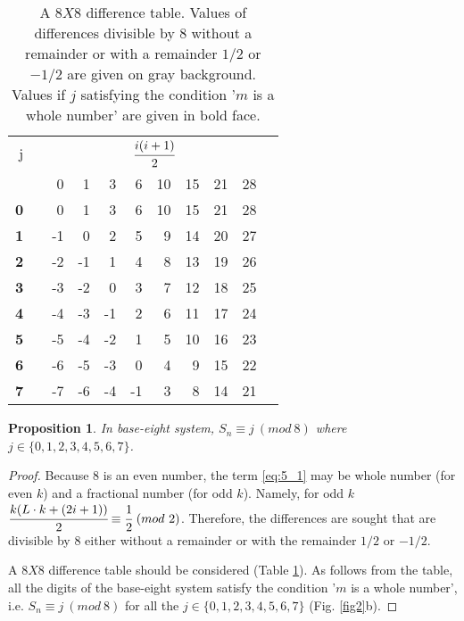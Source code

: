 \documentclass[12pt, twoside, leqno]{article}
\newtheorem{prop}[thm]{Proposition}
\theoremstyle{definition}
\numberwithin{equation}{section}
\begin{document}
\begin{table}[htb]
  \centering
  \caption{A $8X8$ difference table. Values of differences divisible by $8$ without a remainder or with a remainder $1/2$ or $-1/2$ are given on gray background. Values if $j$ satisfying the condition '$m$ is a whole number' are given in bold face.}
    \begin{tabular}{rrrrrrrrrrc}
    \hline
    j&&\multicolumn{8}{c}{$\cfrac{i(i +1)}{2}$}\\ \cline{3-10}
     &    & 0     & 1     & 3     & 6     & 10    & 15    & 21    & 28 \\
    \hline
    \textbf{0} &   & \cellcolor{lightgray}0     & 1     & 3     & 6     & 10    & 15    & 21    &\cellcolor{lightgray} 28 \\
    \textbf{1} &   & -1    & \cellcolor{lightgray}0     & 2     & 5     & 9     & 14    &\cellcolor{lightgray} 20    & 27 \\
    \textbf{2} &   & -2    & -1    & 1     & \cellcolor{lightgray}4     & \cellcolor{lightgray}8     & 13    & 19    & 26 \\
    \textbf{3} &   & -3    & -2    & \cellcolor{lightgray}0     & 3     & 7     & \cellcolor{lightgray}12    & 18    & 25 \\
    \textbf{4} &   & \cellcolor{lightgray}-4    & -3    & -1    & 2     & 6     & 11    & 17    & \cellcolor{lightgray}24 \\
    \textbf{5} &   & -5    & \cellcolor{lightgray}-4    & -2    & 1     & 5     & 10    & \cellcolor{lightgray}16    & 23 \\
    \textbf{6} &   & -6    & -5    & -3    & \cellcolor{lightgray}0     & \cellcolor{lightgray}4     & 9     & 15    & 22 \\
    \textbf{7} &   & -7    & -6    & \cellcolor{lightgray}-4    & -1    & 3     & \cellcolor{lightgray}8     & 14    & 21 \\
    \hline
    \end{tabular}%
  \label{tab:3}%
\end{table}%

\begin{prop}
In base-eight system, $S_n \equiv j \ (mod \ 8)$ where \\ $j \in \{ 0, 1, 2, 3, 4, 5, 6, 7 \}$.
\end{prop}

\begin{proof}
Because $8$ is an even number, the term \ref{eq:5_1} may be whole number (for even $k$) and a fractional number (for odd $k$). Namely, for odd $k$ $\cfrac{k(L\cdot k + (2i + 1))}{2} \equiv \cfrac{1}{2} \ (mod \ 2)$. Therefore, the differences are sought that are divisible by $8$ either without a remainder or with the remainder $1/2$ or $-1/2$.

A $8X8$ difference table should be considered (Table \ref{tab:3}). As follows from the table, all the digits of the base-eight system satisfy the condition '$m$ is a whole number', i.e. $S_n \equiv j \ (mod \ 8)$ for all the $j \in \{ 0, 1, 2, 3, 4, 5, 6, 7 \}$ (Fig. \ref{fig2}b).
\end{proof}
\end{document}
